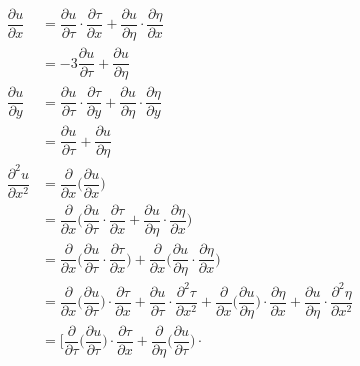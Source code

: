 \newpage
\begin{align*}
  \dfrac{\partial u}{\partial x} &= \dfrac{\partial u}{\partial \tau} \cdot \dfrac{\partial \tau}{\partial x} + %
                                   \dfrac{\partial u}{\partial \eta} \cdot \dfrac{\partial \eta}{\partial x} \\
                                 &=- 3\dfrac{\partial u}{\partial \tau} + \dfrac{\partial u}{\partial \eta} \\
  \dfrac{\partial u}{\partial y} &= \dfrac{\partial u}{\partial \tau} \cdot \dfrac{\partial \tau}{\partial y} + %
                                   \dfrac{\partial u}{\partial \eta} \cdot \dfrac{\partial \eta}{\partial y} \\
                                 &=\dfrac{\partial u}{\partial \tau} + \dfrac{\partial u}{\partial \eta} \\
  \dfrac{\partial^2 u}{\partial x^2} &= \dfrac{\partial}{\partial x} \Big( \dfrac{\partial u}{\partial x} \Big)  \\
                                 &= \dfrac{\partial}{\partial x} \Big( \dfrac{\partial u}{\partial \tau} \cdot %
                                   \dfrac{\partial \tau}{\partial x} + \dfrac{\partial u}{\partial \eta} \cdot \dfrac{\partial \eta}{\partial x} \Big) \\
                                 &= \dfrac{\partial}{\partial x} \Big( \dfrac{\partial u}{\partial \tau} \cdot \dfrac{\partial \tau}{\partial x}\Big) + %
                                   \dfrac{\partial}{\partial x} \Big( \dfrac{\partial u}{\partial \eta} \cdot \dfrac{\partial \eta}{\partial x} \Big) \\
                                 &= \dfrac{\partial}{\partial x} \Big( \dfrac{\partial u}{\partial \tau} \Big) \cdot %
                                   \dfrac{\partial \tau}{\partial x} + \dfrac{\partial u}{\partial \tau} \cdot %
                                   \dfrac{\partial^2 \tau}{\partial x^2} + \dfrac{\partial}{\partial x} \Big( \dfrac{\partial u}{\partial \eta} \Big) \cdot %
                                   \dfrac{\partial \eta}{\partial x} + \dfrac{\partial u}{\partial \eta} \cdot
                                   \dfrac{\partial^2 \eta}{\partial x^2} \\
                                 &= \Big[ \dfrac{\partial}{\partial \tau} \Big(\dfrac{\partial u}{\partial \tau}\Big) \cdot %
                                   \dfrac{\partial \tau}{\partial x} + \dfrac{\partial}{\partial \eta} \Big(\dfrac{\partial u}{\partial \tau}\Big) \cdot %

\end{align*}
